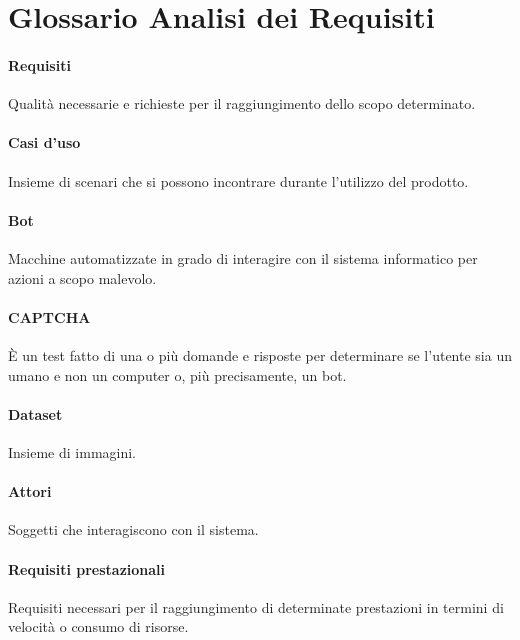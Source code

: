 \section{Glossario Analisi dei Requisiti}

\paragraph{Requisiti}
Qualità necessarie e richieste per il raggiungimento dello scopo determinato.
\paragraph{Casi d'uso}
Insieme di scenari che si possono incontrare durante l'utilizzo del prodotto.
\paragraph{Bot}
Macchine automatizzate in grado di interagire con il sistema informatico per azioni a scopo malevolo.
\paragraph{CAPTCHA}
È un test fatto di una o più domande e risposte per determinare se l'utente sia un umano e non un computer o, più precisamente, un bot.
\paragraph{Dataset}
Insieme di immagini.
\paragraph{Attori}
Soggetti che interagiscono con il sistema.
\paragraph{Requisiti prestazionali}
Requisiti necessari per il raggiungimento di determinate prestazioni in termini di velocità o consumo di risorse.

